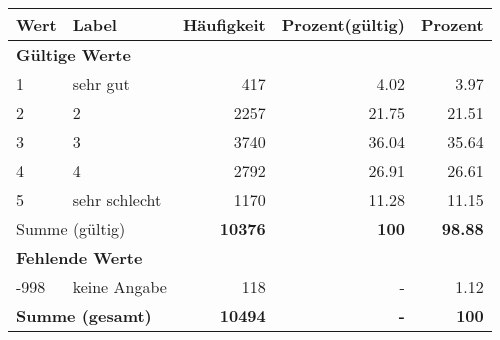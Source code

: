      \begin{longtable}{lXrrr}
     \toprule
     \textbf{Wert} & \textbf{Label} & \textbf{Häufigkeit} & \textbf{Prozent(gültig)} & \textbf{Prozent} \\
     \endhead
     \midrule
     \multicolumn{5}{l}{\textbf{Gültige Werte}}\\

     1 &
     \multicolumn{1}{X}{ sehr gut   } &


       \num{417} &
       \num[round-mode=places,round-precision=2]{4.02} &
         \num[round-mode=places,round-precision=2]{3.97} \\

     2 &
     \multicolumn{1}{X}{ 2   } &


       \num{2257} &
       \num[round-mode=places,round-precision=2]{21.75} &
         \num[round-mode=places,round-precision=2]{21.51} \\

     3 &
     \multicolumn{1}{X}{ 3   } &


       \num{3740} &
       \num[round-mode=places,round-precision=2]{36.04} &
         \num[round-mode=places,round-precision=2]{35.64} \\

     4 &
     \multicolumn{1}{X}{ 4   } &


       \num{2792} &
       \num[round-mode=places,round-precision=2]{26.91} &
         \num[round-mode=places,round-precision=2]{26.61} \\

     5 &
     \multicolumn{1}{X}{ sehr schlecht   } &


       \num{1170} &
       \num[round-mode=places,round-precision=2]{11.28} &
         \num[round-mode=places,round-precision=2]{11.15} \\
     \midrule
     \multicolumn{2}{l}{Summe (gültig)} &
       \textbf{\num{10376}} &
     \textbf{\num{100}} &
       \textbf{\num[round-mode=places,round-precision=2]{98.88}} \\
     \multicolumn{5}{l}{\textbf{Fehlende Werte}}\\
       -998 &
       keine Angabe &
         \num{118} &
        - &
         \num[round-mode=places,round-precision=2]{1.12} \\
     \midrule
     \multicolumn{2}{l}{\textbf{Summe (gesamt)}} &
          \textbf{\num{10494}} &
        \textbf{-} &
        \textbf{\num{100}} \\
     \bottomrule
     \end{longtable}
     
